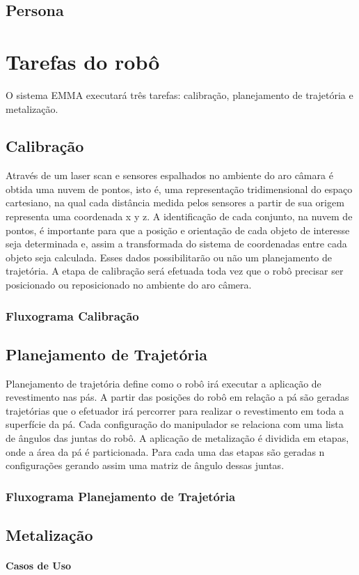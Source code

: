 \documentclass[12pt,a4paper]{article}
\begin{document}
\subsection {Persona}


\section{Tarefas do robô}
O sistema EMMA executará três tarefas: calibração, planejamento de trajetória e metalização.

\subsection {Calibração}
Através de um laser scan e sensores espalhados no ambiente do aro câmara é obtida uma nuvem de pontos, 
isto é, uma representação tridimensional do espaço cartesiano, na qual cada distância medida pelos 
sensores a partir de sua origem representa uma coordenada x y z. A identificação de cada conjunto, 
na nuvem de pontos, é importante para que a posição e orientação de cada objeto de interesse seja 
determinada e, assim a transformada do sistema de coordenadas entre cada objeto seja calculada. 
Esses dados possibilitarão ou não um planejamento de trajetória. A etapa de calibração será efetuada 
toda vez que o robô precisar ser posicionado ou reposicionado no ambiente do aro câmera.

\subsubsection {Fluxograma Calibração}

\subsection {Planejamento de Trajetória}
Planejamento de trajetória define como o robô irá executar a aplicação de revestimento nas pás. 
A partir das posições do robô em relação a pá são geradas trajetórias que o efetuador irá percorrer 
para realizar o revestimento em toda a superfície da pá. Cada configuração do manipulador se relaciona 
com uma lista de ângulos das juntas do robô. A aplicação de metalização é dividida em etapas, onde a 
área da pá é particionada.  Para cada uma das etapas são geradas n configurações gerando assim uma matriz 
de ângulo dessas juntas.

\subsubsection {Fluxograma Planejamento de Trajetória}

\subsection {Metalização}


\paragraph{Casos de Uso}
\end{document}
